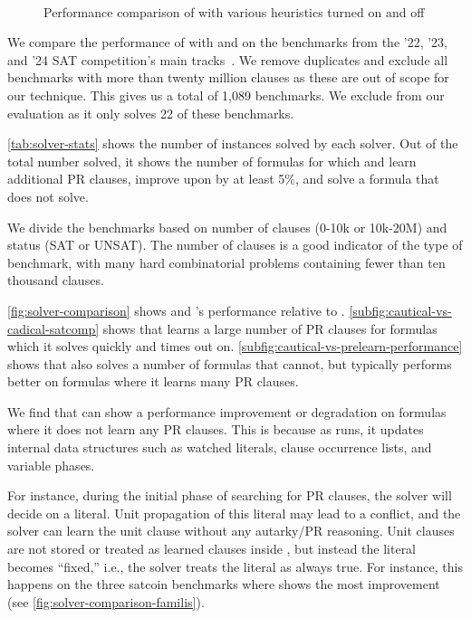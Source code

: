 \begin{figure}[!t]
    \centering
    
    \caption{Performance comparison of \tool with various heuristics turned on and off}~\label{fig:global-heuristics}
\end{figure}

We compare the performance of \tool with \cadical and \prelearn on the
benchmarks from the '22, '23, and '24 SAT competition's main
tracks~\cite{satcomp2022,satcomp2023,satcomp2024}. We remove duplicates and
exclude all benchmarks with more than twenty million clauses as these are out of
scope for our technique. This gives us a total of 1,089 benchmarks. We exclude
\sadical from our evaluation as it only solves 22 of these benchmarks.

\autoref{tab:solver-stats} shows the number of instances solved by each solver.
Out of the total number solved, it shows the number of formulas for which
\prelearn and \tool learn additional PR clauses, improve upon \cadical by at
least 5\%, and solve a formula that \cadical does not solve. 

We divide the benchmarks based on number of clauses (0-10k or 10k-20M) and
status (SAT or UNSAT). The number of clauses is a good indicator of the type of
benchmark, with many hard combinatorial problems containing fewer than ten
thousand clauses.

\autoref{fig:solver-comparison} shows \tool and \cadical's performance relative
to \cadical.
\autoref{subfig:cautical-vs-cadical-satcomp} shows that \tool learns a large
number of PR clauses for formulas which it solves quickly and \cadical times
out on. \autoref{subfig:cautical-vs-prelearn-performance} shows that \prelearn
also solves a number of formulas that \tool cannot, but \tool typically performs
better on formulas where it learns many PR clauses.

We find that \tool can show a performance improvement or degradation on formulas
where it does not learn any PR clauses. This is because as \tool runs, it
updates internal data structures such as watched literals, clause occurrence
lists, and variable phases. 

For instance, during the initial phase of searching for PR clauses, the solver
will decide on a literal. Unit propagation of this literal may lead to a
conflict, and the solver can learn the unit clause without any autarky/PR
reasoning. Unit clauses are not stored or treated as learned clauses inside
\cadical, but instead the literal becomes “fixed,” i.e., the solver treats the
literal as always true. For instance, this happens on the three satcoin
benchmarks where \tool shows the most improvement (see
\autoref{fig:solver-comparison-familis}).


